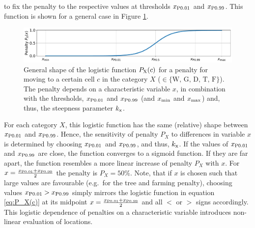 to fix the penalty to the respective values at thresholds $x_{\rm P0.01}$ and $x_{\rm P0.99}$.
This function is shown for a general case in Figure \ref{fig:logF}.
\begin{figure}
	\centering
	\includegraphics[width=\textwidth]{images/general_logF.pdf}
	\caption{General shape of the logistic function $P_{\rm X}(c)$ for a penalty for moving to a certain cell $c$ in the category $X$ ($\in\{\text{W, G, D, T, F}\}$). The penalty depends on a characteristic variable $x$, in combination with the thresholds, $x_{\rm P0.01}$ and $x_{\rm P0.99}$ (and $x_{\rm min}$ and $x_{\rm max}$) and, thus, the steepness parameter $k_{\rm x}$.}
	\label{fig:logF}
\end{figure}
For each category $X$, this logistic function has the same (relative) shape between $x_{\rm P0.01}$ and $x_{\rm P0.99}$. %
Hence, the sensitivity of penalty $P_X$ to differences in variable $x$ is determined by choosing $x_{\rm P0.01}$ and $x_{\rm P0.99}$, and thus, $k_{\rm x}$.
If the values of $x_{\rm P0.01}$ and $x_{\rm P0.99}$ are close, the function converges to a sigmoid function. 
If they are far apart, the function resembles a more linear increase of penalty $P_X$ with $x$.
For $x=\frac{x_{\rm P0.01} + x_{\rm P0.99}}{2}$ the penalty is $P_X = 50\%$.
Note, that if $x$ is chosen such that large values are favourable (e.g.\ for the tree and farming penalty), choosing values $x_{\rm P0.01}>x_{\rm P0.99}$ simply mirrors the logistic function in equation \ref{eq:P_X(c)} at its midpoint $x=\frac{x_{\rm P0.01}+x_{\rm P0.99}}{2}$ and all $<$ or $>$ signs accordingly.
This logistic dependence of penalties on a characteristic variable introduces non-linear evaluation of locations.


